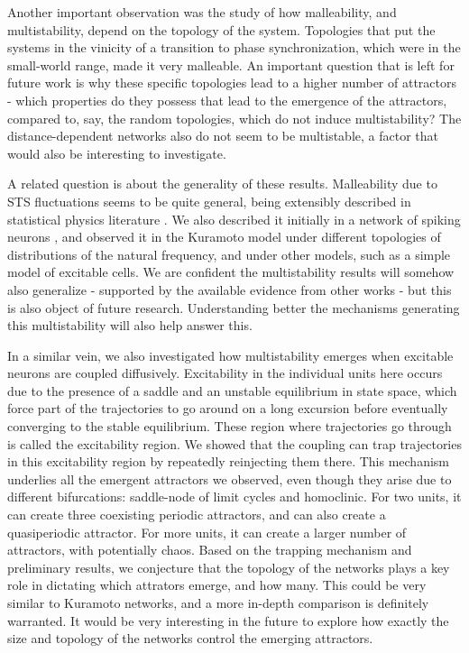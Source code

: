 Another important observation was the study of how malleability, and multistability, depend on the topology of the system. Topologies that put the systems in the vinicity of a transition to phase synchronization, which were in the small-world range, made it very malleable. An important question that is left for future work is why these specific topologies lead to a higher number of attractors - which properties do they possess that lead to the emergence of the attractors, compared to, say, the random topologies, which do not induce multistability? The distance-dependent networks also do not seem to be multistable, a factor that would also be interesting to investigate. 

A related question is about the generality of these results. Malleability due to STS fluctuations seems to be quite general, being extensibly described in statistical physics literature \cite{sornette2006critical}. We also described it initially in a network of spiking neurons \cite{budzinski2020synchronization}, and observed it in the Kuramoto model under different topologies of distributions of the natural frequency, and under other models, such as a simple model of excitable cells. We are confident the multistability results will somehow also generalize - supported by the available evidence from other works - but this is also object of future research. Understanding better the mechanisms generating this multistability will also help answer this.

In a similar vein, we also investigated how multistability emerges when excitable neurons are coupled diffusively. Excitability in the individual units here occurs due to the presence of a saddle and an unstable equilibrium in state space, which force part of the trajectories to go around on a long excursion before eventually converging to the stable equilibrium. These region where trajectories go through is called the excitability region. We showed that the coupling can trap trajectories in this excitability region by repeatedly reinjecting them there. This mechanism underlies all the emergent attractors we observed, even though they arise due to different bifurcations: saddle-node of limit cycles and homoclinic. For two units, it can create three coexisting periodic attractors, and can also create a quasiperiodic attractor. For more units, it can create a larger number of attractors, with potentially chaos. Based on the trapping mechanism and preliminary results, we conjecture that the topology of the networks plays a key role in dictating which attrators emerge, and how many. This could be very similar to Kuramoto networks, and a more in-depth comparison is definitely warranted. It would be very interesting in the future to explore how exactly the size and topology of the networks control the emerging attractors. 

